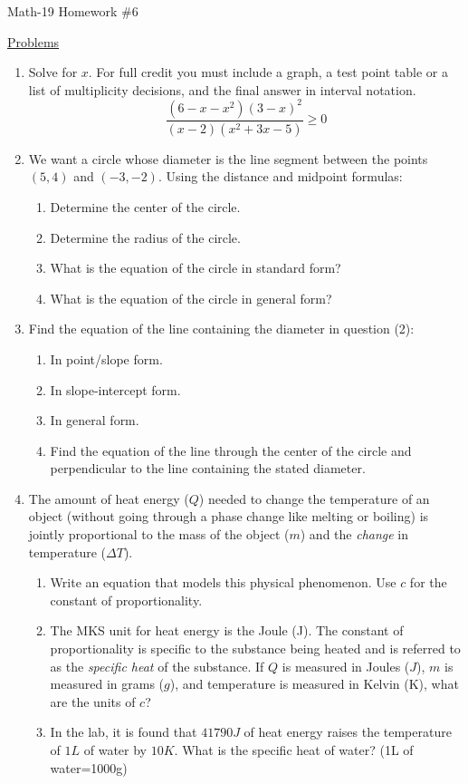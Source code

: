 \documentclass[letterpaper,12pt,fleqn]{article}
\begin{document}
\begin{center}
\Large Math-19 Homework \#6
\end{center}

\vspace{0.5in}

\underline{Problems}

\begin{enumerate}
\item Solve for $x$. For full credit you must include a graph, a test point
  table or a list of multiplicity decisions, and the final answer in interval
  notation.
  \[\frac{(6-x-x^2)(3-x)^2}{(x-2)(x^2+3x-5)}\ge0\]

\item We want a circle whose diameter is the line segment between the points
$(5,4)$ and $(-3,-2)$. Using the distance and midpoint formulas:
\begin{enumerate}
\item{Determine the center of the circle.}
\item{Determine the radius of the circle.}
\item{What is the equation of the circle in standard form?}
\item{What is the equation of the circle in general form?}
\end{enumerate}

\item Find the equation of the line containing the diameter in question (2):
\begin{enumerate}
\item{In point/slope form.}
\item{In slope-intercept form.}
\item{In general form.}
\item{Find the equation of the line through the center of the circle and
perpendicular to the line containing the stated diameter.}
\end{enumerate}

\item The amount of heat energy ($Q$) needed to change the temperature of an
object (without going through a phase change like melting or boiling) is jointly
proportional to the mass of the object ($m$) and the \emph{change} in
temperature ($\Delta T$).
\begin{enumerate}
\item Write an equation that models this physical phenomenon. Use $c$ for the
constant of proportionality.
\item The MKS unit for heat energy is the Joule (J). The constant of
proportionality is specific to the substance being heated and is referred to as
the \emph{specific heat} of the substance. If $Q$ is measured in Joules ($J$),
$m$ is measured in grams ($g$), and temperature is measured in Kelvin (K), what
are the units of $c$?
\item In the lab, it is found that $41790J$ of heat energy raises the
temperature of $1L$ of water by $10K$. What is the specific heat of water?
(1L of water=1000g)
\end{enumerate}


\end{enumerate}
\end{document}
